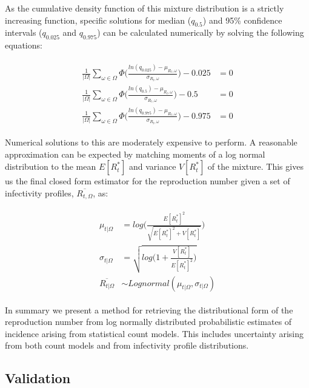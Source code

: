 \documentclass[10pt,letterpaper]{article}
\begin{document}
As the cumulative density function of this mixture distribution is a strictly increasing function, specific solutions for median ($q_{0.5}$) and 95\% confidence intervals ($q_{0.025}$ and $q_{0.975}$) can be calculated numerically by solving the following equations:

\begin{eqnarray}
\label{eq:final_4}
\begin{aligned}
\frac{1}{|\Omega|}\sum_{\omega \in \Omega} \Phi\bigg(\frac{ln(q_{0.025}) - \mu_{R_t,\omega}}{\sigma_{R_t,\omega}}\bigg) - 0.025 &= 0 \\
\frac{1}{|\Omega|}\sum_{\omega \in \Omega} \Phi\bigg(\frac{ln(q_{0.5}) - \mu_{R_t,\omega}}{\sigma_{R_t,\omega}}\bigg) - 0.5 &= 0 \\
\frac{1}{|\Omega|}\sum_{\omega \in \Omega} \Phi\bigg(\frac{ln(q_{0.975}) - \mu_{R_t,\omega}}{\sigma_{R_t,\omega}}\bigg) - 0.975 &= 0
\end{aligned}
\end{eqnarray}

Numerical solutions to this are moderately expensive to perform. A reasonable approximation can be expected by matching moments of a log normal distribution to the mean $E[R_t^*]$ and variance $V[R_t^*]$ of the mixture. This gives us the final closed form estimator for the reproduction number given a set of infectivity profiles, $\overline{R_{t,\Omega}}$, as:

\begin{eqnarray}
\begin{aligned}
\mu_{t|\Omega} &= log\bigg(\frac{E[R_t^*]^2}{\sqrt{E[R_t^*]^2 + V[R_t^*]}}\bigg) \\
\sigma_{t|\Omega} &= \sqrt{log\bigg(1 + \frac{V[R_t^*]}{E[R_t^*]^2}\bigg)}\\
\overline{R_{t|\Omega}} &\sim Lognormal(\mu_{t|\Omega},\sigma_{t|\Omega})
\end{aligned}
\end{eqnarray}

In summary we present a method for retrieving the distributional form of the reproduction number from log normally distributed probabilistic estimates of incidence arising from statistical count models. This includes uncertainty arising from both count models and from infectivity profile distributions.

\subsection*{Validation}
\end{document}
